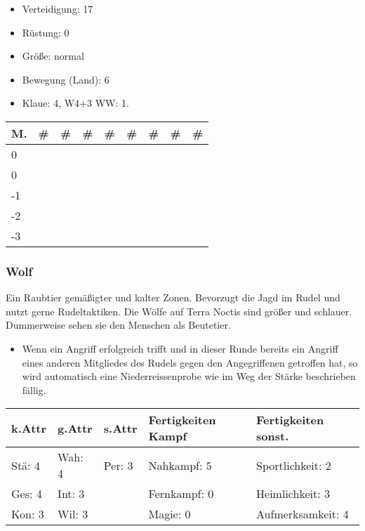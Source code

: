 \documentclass{article}
\begin{document}
\begin{itemize}
\item Verteidigung: 17
\item Rüstung:      0
\item Größe: normal
\item Bewegung (Land): 6
\item Klaue: 4, W4+3 WW: 1.
\end{itemize}


\begin{small}
\begin{tabular}{|m{6mm}|m{3mm}|m{3mm}|m{3mm}|m{3mm}|m{3mm}|m{3mm}|m{3mm}|m{3mm}|}
\hline
\textbf{M.}&\textbf{\#}&\textbf{\#}&\textbf{\#}&\textbf{\#}&\textbf{\#}&\textbf{\#}&\textbf{\#}&\textbf{\#}\\
\hline
\hline
0& & & & & & & & \\
\hline
0& & & & & & & & \\
\hline
-1& & & & & & & & \\
\hline
-2& & & & & & & & \\
\hline
-3& & & & & & & & \\
\hline
\end{tabular}
\end{small}

\subsubsection{Wolf}

Ein Raubtier gemäßigter und kalter Zonen. Bevorzugt die Jagd im Rudel und nutzt gerne Rudeltaktiken. Die Wölfe auf
Terra Noctis sind größer und schlauer. Dummerweise sehen sie den Menschen als Beutetier.
\begin{itemize}
\item Wenn ein Angriff erfolgreich trifft und in dieser Runde bereits ein Angriff eines anderen Mitgliedes des Rudels gegen den Angegriffenen getroffen hat, so wird automatisch eine Niederreissenprobe wie im Weg der Stärke beschrieben fällig.
\end{itemize}


\begin{small}
\begin{tabular}{|m{15mm}|m{15mm}|m{15mm}|m{35mm}|m{35mm}|}
\hline
\textbf{k.Attr}&\textbf{g.Attr}&\textbf{s.Attr}&\textbf{Fertigkeiten Kampf}&\textbf{Fertigkeiten sonst.}\\
\hline
\hline
Stä: 4&Wah: 4&Per: 3&Nahkampf: 5&Sportlichkeit: 2\\
\hline
Ges: 4&Int: 3& &Fernkampf: 0&Heimlichkeit: 3\\
\hline
Kon: 3&Wil: 3& &Magie: 0&Aufmerksamkeit: 4\\
\hline
\end{tabular}
\end{small}
\end{document}
